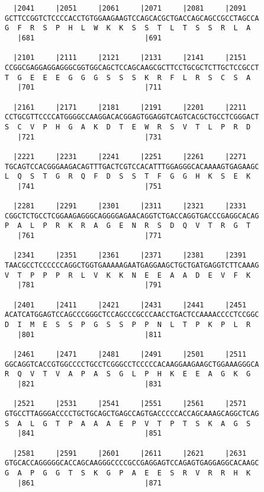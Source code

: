 \documentclass{article}
\begin{document}
\begin{Verbatim}
  |2041     |2051     |2061     |2071     |2081     |2091   
GCTTCCGGTCTCCCCACCTGTGGAAGAAGTCCAGCACGCTGACCAGCAGCCGCCTAGCCA
G  F  R  S  P  H  L  W  K  K  S  S  T  L  T  S  S  R  L  A  
   |681                          |691                       
  
  |2101     |2111     |2121     |2131     |2141     |2151   
CCGGCGAGGAGGAGGGCGGTGGCAGCTCCAGCAAGCGCTTCCTGCGCTCTTGCTCCGCCT
T  G  E  E  E  G  G  G  S  S  S  K  R  F  L  R  S  C  S  A  
   |701                          |711                       
  
  |2161     |2171     |2181     |2191     |2201     |2211   
CCTGCGTTCCCCATGGGGCCAAGGACACGGAGTGGAGGTCAGTCACGCTGCCTCGGGACT
S  C  V  P  H  G  A  K  D  T  E  W  R  S  V  T  L  P  R  D  
   |721                          |731                       
  
  |2221     |2231     |2241     |2251     |2261     |2271   
TGCAGTCCACGGGAAGACAGTTTGACTCGTCCACATTTGGAGGGCACAAAAGTGAGAAGC
L  Q  S  T  G  R  Q  F  D  S  S  T  F  G  G  H  K  S  E  K  
   |741                          |751                       
  
  |2281     |2291     |2301     |2311     |2321     |2331   
CGGCTCTGCCTCGGAAGAGGGCAGGGGAGAACAGGTCTGACCAGGTGACCCGAGGCACAG
P  A  L  P  R  K  R  A  G  E  N  R  S  D  Q  V  T  R  G  T  
   |761                          |771                       
  
  |2341     |2351     |2361     |2371     |2381     |2391   
TAACGCCTCCCCCCAGGCTGGTGAAAAAGAATGAGGAAGCTGCTGATGAGGTCTTCAAAG
V  T  P  P  P  R  L  V  K  K  N  E  E  A  A  D  E  V  F  K  
   |781                          |791                       
  
  |2401     |2411     |2421     |2431     |2441     |2451   
ACATCATGGAGTCCAGCCCGGGCTCCAGCCCGCCCAACCTGACTCCAAAACCCCTCCGGC
D  I  M  E  S  S  P  G  S  S  P  P  N  L  T  P  K  P  L  R  
   |801                          |811                       
  
  |2461     |2471     |2481     |2491     |2501     |2511   
GGCAGGTCACCGTGGCCCCTGCCTCGGGCCTCCCCCACAAGGAAGAAGCTGGAAAGGGCA
R  Q  V  T  V  A  P  A  S  G  L  P  H  K  E  E  A  G  K  G  
   |821                          |831                       
  
  |2521     |2531     |2541     |2551     |2561     |2571   
GTGCCTTAGGGACCCCTGCTGCAGCTGAGCCAGTGACCCCCACCAGCAAAGCAGGCTCAG
S  A  L  G  T  P  A  A  A  E  P  V  T  P  T  S  K  A  G  S  
   |841                          |851                       
  
  |2581     |2591     |2601     |2611     |2621     |2631   
GTGCACCAGGGGGCACCAGCAAGGGCCCCGCCGAGGAGTCCAGAGTGAGGAGGCACAAGC
G  A  P  G  G  T  S  K  G  P  A  E  E  S  R  V  R  R  H  K  
   |861                          |871                       
  

\end{Verbatim}
\end{document}
